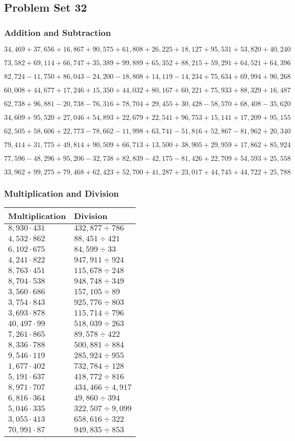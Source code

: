 \hypertarget{problem-set-32-4}{%
\subsection{Problem Set 32}\label{problem-set-32-4}}

\hypertarget{addition-and-subtraction-254}{%
\subsubsection{Addition and
Subtraction}\label{addition-and-subtraction-254}}

\(34,469+37,656+16,867+90,575+61,808+26,225+18,127+95,531+53,820+ 40,240\)

\(73,582+69,114+66,747+35,389+99,889+65,352+88,215+59,291+64,521+64,396\)

\(82,724-11,750+86,043-24,200-18,808+14,119-14,234+75,634+69,994+90,268\)

\(60,008+44,677+17,246+15,350+44,032+80,167+60,221+75,933+88,329+16,487\)

\(62,738+96,881-20,738-76,316+78,704+29,455+30,428-58,570+68,408-35,620\)

\(34,609+95,520+27,046+54,893+22,679+22,541+96,753+15,141+17,209+95,155\)

\(62,505+58,606+22,773-78,662-11,998+63,741-51,816+52,867-81,962+20,340\)

\(79,414+31,775+49,814+90,509+66,713+13,500+38,905+29,959+17,862+85,924\)

\(77,596-48,296+95,206-32,738+82,839-42,175-81,426+22,709+54,593+25,558\)

\(33,962+99,275+79,468+62,423+52,700+41,287+23,017+44,745+44,722+25,788\)

\hypertarget{multiplication-and-division-253}{%
\subsubsection{Multiplication and
Division}\label{multiplication-and-division-253}}

\begin{longtable}[]{@{}ll@{}}
\toprule
Multiplication & Division\tabularnewline
\midrule
\endhead
\(8,930\cdot431\) & \(432,877÷786\)\tabularnewline
\(4,532\cdot862\) & \(88,451÷421\)\tabularnewline
\(6,102\cdot675\) & \(84,599÷33\)\tabularnewline
\(4,241\cdot822\) & \(947,911÷924\)\tabularnewline
\(8,763\cdot451\) & \(115,678÷248\)\tabularnewline
\(8,704\cdot538\) & \(948,748÷349\)\tabularnewline
\(3,560\cdot686\) & \(157,105÷89\)\tabularnewline
\(3,754\cdot843\) & \(925,776÷803\)\tabularnewline
\(3,693\cdot878\) & \(115,714÷796\)\tabularnewline
\(40,497\cdot99\) & \(518,039÷263\)\tabularnewline
\(7,261\cdot865\) & \(89,578÷422\)\tabularnewline
\(8,336\cdot788\) & \(500,881÷884\)\tabularnewline
\(9,546\cdot119\) & \(285,924÷955\)\tabularnewline
\(1,677\cdot402\) & \(732,784÷128\)\tabularnewline
\(5,191\cdot637\) & \(418,772÷816\)\tabularnewline
\(8,971\cdot707\) & \(434,466÷4,917\)\tabularnewline
\(6,816\cdot364\) & \(49,860÷394\)\tabularnewline
\(5,046\cdot335\) & \(322,507÷9,099\)\tabularnewline
\(3,055\cdot413\) & \(658,616÷322\)\tabularnewline
\(70,991\cdot87\) & \(949,835÷853\)\tabularnewline
\bottomrule
\end{longtable}

